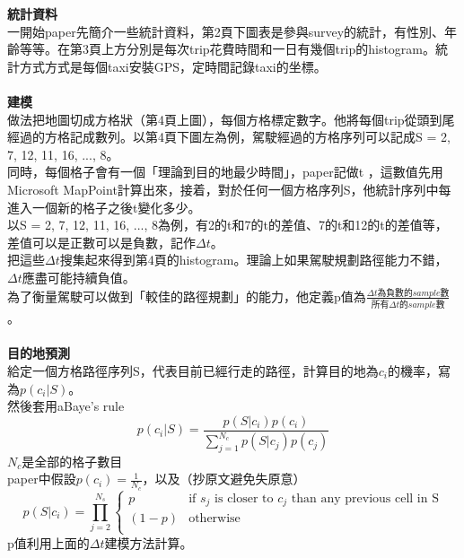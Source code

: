 \documentclass{article}
\begin{document}
\textbf{統計資料}\\
一開始paper先簡介一些統計資料，第2頁下圖表是參與survey的統計，有性別、年齡等等。在第3頁上方分別是每次trip花費時間和一日有幾個trip的histogram。統計方式方式是每個taxi安裝GPS，定時間記錄taxi的坐標。\\
\\
\textbf{建模}\\
做法把地圖切成方格狀（第4頁上圖），每個方格標定數字。他將每個trip從頭到尾經過的方格記成數列。以第4頁下圖左為例，駕駛經過的方格序列可以記成S = {2, 7, 12, 11, 16, ..., 8}。\\
同時，每個格子會有一個「理論到目的地最少時間」，paper記做t ，這數值先用Microsoft MapPoint計算出來，接着，對於任何一個方格序列S，他統計序列中每進入一個新的格子之後t變化多少。\\
以S = {2, 7, 12, 11, 16, ..., 8}為例，有2的t和7的t的差值、7的t和12的t的差值等，差值可以是正數可以是負數，記作$\Delta t$。\\
把這些$\Delta t$搜集起來得到第4頁的histogram。理論上如果駕駛規劃路徑能力不錯，$\Delta t$應盡可能持續負值。\\
為了衡量駕駛可以做到「較佳的路徑規劃」的能力，他定義p值為$\frac {\Delta t為負數的sample數} {所有\Delta t的sample數}$。\\
\\
\textbf{目的地預測}\\
給定一個方格路徑序列S，代表目前已經行走的路徑，計算目的地為$c_{i}$的機率，寫為$p(c_{i}|S)$。\\
然後套用aBaye's rule\\
$$p(c_{i}|S) = \frac {p(S|c_{i})p(c_{i})} {\sum_{j=1}^{N_{c}}p(S|c_{j})p(c_{j})}$$
$N_{c}$是全部的格子數目\\
paper中假設$p(c_{i})=\frac{1}{N_{c}}$，以及（抄原文避免失原意）\\
$$p(S|c_{i})=\prod_{j=2}^{N_{s}}
\begin{cases}
  p & \text{if }s_{j}\text{ is closer to }c_{j}\text{ than any previous cell in S}\\
  (1-p) & \text{otherwise}\\
\end{cases}$$
p值利用上面的$\Delta t$建模方法計算。
\end{document}
